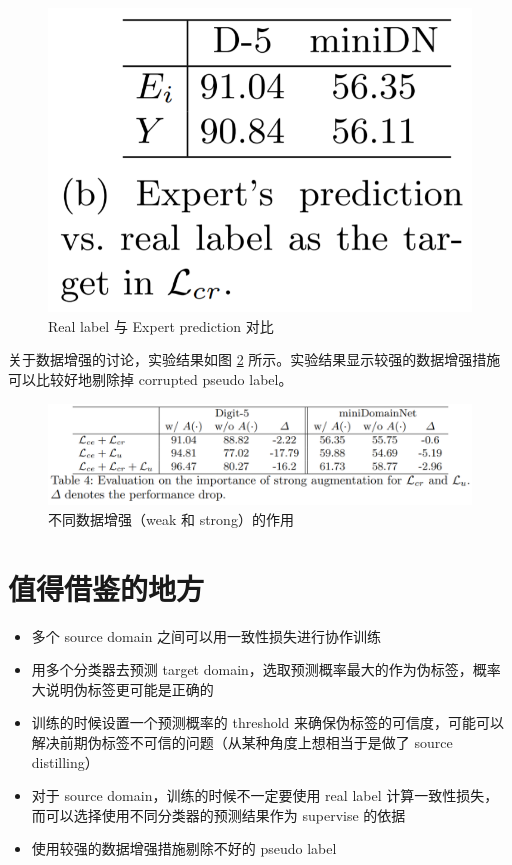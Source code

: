\documentclass[UTF8]{ctexart}
\begin{document}
\begin{figure}[ht]
    \centering
    \includegraphics[scale=0.35]{20200927_Expert_Real.png}
    \caption{Real label 与 Expert prediction 对比}
    \label{fig:ER}
\end{figure}

关于数据增强的讨论，实验结果如图 \ref{fig:DataA} 所示。实验结果显示较强的数据增强措施可以比较好地剔除掉 corrupted pseudo label。

\begin{figure}[ht]
    \centering
    \includegraphics[scale=0.35]{20200927_DataA.png}
    \caption{不同数据增强（weak 和 strong）的作用}
    \label{fig:DataA}
\end{figure}

\section{值得借鉴的地方}

\begin{itemize}
    \item 多个 source domain 之间可以用一致性损失进行协作训练
    \item 用多个分类器去预测 target domain，选取预测概率最大的作为伪标签，概率大说明伪标签更可能是正确的
    \item 训练的时候设置一个预测概率的 threshold 来确保伪标签的可信度，可能可以解决前期伪标签不可信的问题（从某种角度上想相当于是做了 source distilling）
    \item 对于 source domain，训练的时候不一定要使用 real label 计算一致性损失，而可以选择使用不同分类器的预测结果作为 supervise 的依据
    \item 使用较强的数据增强措施剔除不好的 pseudo label
\end{itemize}
\end{document}
